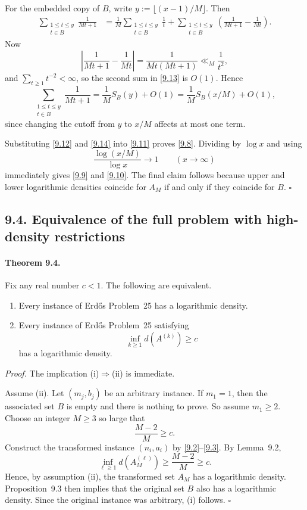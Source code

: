 For the embedded copy of $B$, write $y:=\lfloor (x-1)/M\rfloor$.  Then
\begin{align}
\sum_{\substack{1\le t\le y\\ t\in B}}\frac1{Mt+1}
&=
\frac1M\sum_{\substack{1\le t\le y\\ t\in B}}\frac1t
+\sum_{\substack{1\le t\le y\\ t\in B}}\left(\frac1{Mt+1}-\frac1{Mt}\right).
\tag{9.13}
\end{align}
Now
\[
\left|\frac1{Mt+1}-\frac1{Mt}\right|=\frac{1}{Mt(Mt+1)}\ll_M \frac1{t^2},
\]
and $\sum_{t\ge 1}t^{-2}<\infty$, so the second sum in \eqref{9.13} is $O(1)$.  Hence
\begin{equation}
\sum_{\substack{1\le t\le y\\ t\in B}}\frac1{Mt+1}
=
\frac1M S_B(y)+O(1)
=
\frac1M S_B(x/M)+O(1),
\tag{9.14}
\end{equation}
since changing the cutoff from $y$ to $x/M$ affects at most one term.

Substituting \eqref{9.12} and \eqref{9.14} into \eqref{9.11} proves \eqref{9.8}.
Dividing by $\log x$ and using
\[
\frac{\log(x/M)}{\log x}\to 1
\qquad (x\to\infty)
\]
immediately gives \eqref{9.9} and \eqref{9.10}.  The final claim follows because upper and lower logarithmic densities coincide for $A_M$ if and only if they coincide for $B$. \hfill $\square$

\subsection*{9.4. Equivalence of the full problem with high-density restrictions}
\paragraph{Theorem 9.4.}
Fix any real number $c<1$.  The following are equivalent.
\begin{enumerate}
\item[(i)] Every instance of Erd\H{o}s Problem~25 has a logarithmic density.
\item[(ii)] Every instance of Erd\H{o}s Problem~25 satisfying
\begin{equation}
\inf_{k\ge 1} d(A^{(k)})\ge c
\tag{9.15}
\end{equation}
has a logarithmic density.
\end{enumerate}

\emph{Proof.}
The implication (i)$\Rightarrow$(ii) is immediate.

Assume (ii).  Let $(m_j,b_j)$ be an arbitrary instance.  If $m_1=1$, then the associated set $B$ is empty and there is nothing to prove.  So assume $m_1\ge 2$.
Choose an integer $M\ge 3$ so large that
\begin{equation}
\frac{M-2}{M}\ge c.
\tag{9.16}
\end{equation}
Construct the transformed instance $(n_i,a_i)$ by \eqref{9.2}--\eqref{9.3}.  By Lemma~9.2,
\[
\inf_{\ell\ge 1} d(A_M^{(\ell)})\ge \frac{M-2}{M}\ge c.
\]
Hence, by assumption (ii), the transformed set $A_M$ has a logarithmic density.
Proposition~9.3 then implies that the original set $B$ also has a logarithmic density.
Since the original instance was arbitrary, (i) follows. \hfill $\square$

